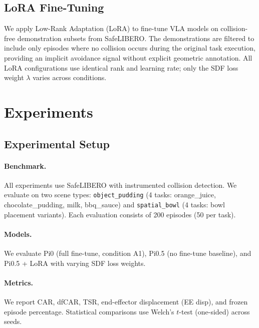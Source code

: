 \documentclass[letterpaper]{article}
\begin{document}
\subsection{LoRA Fine-Tuning}
\label{sec:lora}

We apply Low-Rank Adaptation (LoRA) to fine-tune VLA models on collision-free demonstration subsets from SafeLIBERO. The demonstrations are filtered to include only episodes where no collision occurs during the original task execution, providing an implicit avoidance signal without explicit geometric annotation. All LoRA configurations use identical rank and learning rate; only the SDF loss weight $\lambda$ varies across conditions.


\section{Experiments}
\label{sec:experiments}

\subsection{Experimental Setup}

\paragraph{Benchmark.} All experiments use SafeLIBERO with instrumented collision detection. We evaluate on two scene types: \texttt{object\_pudding} (4 tasks: orange\_juice, chocolate\_pudding, milk, bbq\_sauce) and \texttt{spatial\_bowl} (4 tasks: bowl placement variants). Each evaluation consists of 200 episodes (50 per task).

\paragraph{Models.} We evaluate Pi0 (full fine-tune, condition A1), Pi0.5 (no fine-tune baseline), and Pi0.5 + LoRA with varying SDF loss weights.

\paragraph{Metrics.} We report CAR, dfCAR, TSR, end-effector displacement (EE disp), and frozen episode percentage. Statistical comparisons use Welch's $t$-test (one-sided) across seeds.
\end{document}
